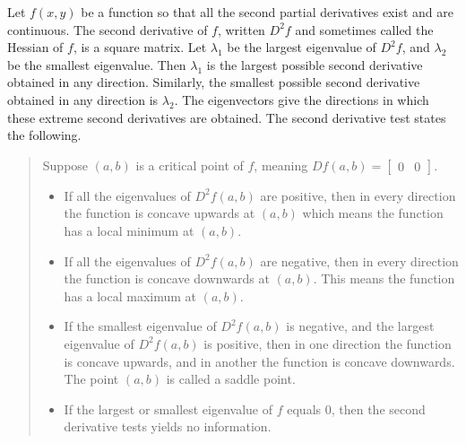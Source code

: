 \begin{theorem}
Let $f(x,y)$ be a function so that all the second partial derivatives exist and are continuous. The second derivative of $f$, written $D^2f$ and sometimes called the Hessian of $f$, is a square matrix. Let $\lambda_1$ be the largest eigenvalue of $D^2f$, and $\lambda_2$ be the smallest eigenvalue. Then $\lambda_1$ is the largest possible second derivative obtained in any direction. Similarly, the smallest possible second derivative obtained in any direction is $\lambda_2$. The eigenvectors give the directions in which these extreme second derivatives are obtained.  The second derivative test states the following.
\begin{quote}
Suppose $(a,b)$ is a critical point of $f$, meaning $Df(a,b) = \begin{bmatrix}0&0\end{bmatrix}$.  
\begin{itemize}
 \item If all the eigenvalues of $D^2f(a,b)$ are positive, then in every direction the function is concave upwards at $(a,b)$ which means the function has a local minimum at $(a,b)$. 
 \item If all the eigenvalues of $D^2f(a,b)$ are negative, then in every direction the function is concave downwards at $(a,b)$. This means the function has a local maximum at $(a,b)$. 
 \item If the smallest eigenvalue of $D^2f(a,b)$ is negative, and the largest eigenvalue of $D^2f(a,b)$ is positive, then  in one direction the function is concave upwards, and in another the function is concave downwards. The point $(a,b)$ is called a saddle point.
 \item If the largest or smallest eigenvalue of $f$ equals 0, then the second derivative tests yields no information. 
\end{itemize}
 
\end{quote}
  
 
\end{theorem}


